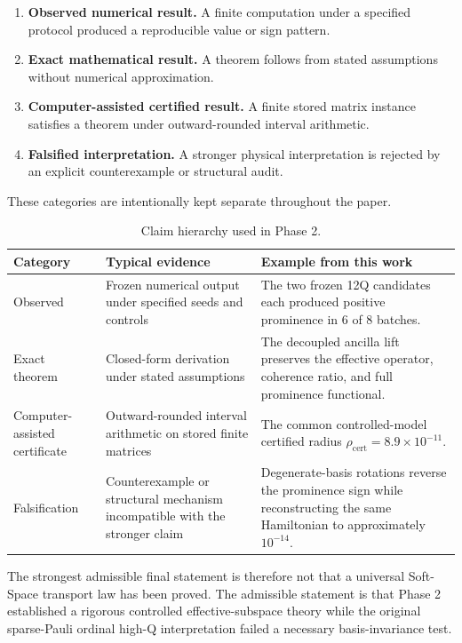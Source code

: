 \documentclass[11pt,a4paper]{article}
\begin{document}
\begin{enumerate}[label=\arabic*.]
\item \textbf{Observed numerical result.}
      A finite computation under a specified protocol produced a reproducible
      value or sign pattern.
\item \textbf{Exact mathematical result.}
      A theorem follows from stated assumptions without numerical
      approximation.
\item \textbf{Computer-assisted certified result.}
      A finite stored matrix instance satisfies a theorem under outward-rounded
      interval arithmetic.
\item \textbf{Falsified interpretation.}
      A stronger physical interpretation is rejected by an explicit
      counterexample or structural audit.
\end{enumerate}

These categories are intentionally kept separate throughout the paper.

\begin{table}[H]
\centering
\caption{Claim hierarchy used in Phase 2.}
\begin{tabular}{@{}p{}p{}p{}@{}}
\toprule
Category & Typical evidence & Example from this work\\
\midrule
Observed &
Frozen numerical output under specified seeds and controls &
The two frozen 12Q candidates each produced positive prominence in 6 of 8 batches.\\

Exact theorem &
Closed-form derivation under stated assumptions &
The decoupled ancilla lift preserves the effective operator, coherence ratio,
and full prominence functional.\\

Computer-assisted certificate &
Outward-rounded interval arithmetic on stored finite matrices &
The common controlled-model certified radius
\(\rho_{\mathrm{cert}}=8.9\times10^{-11}\).\\

Falsification &
Counterexample or structural mechanism incompatible with the stronger claim &
Degenerate-basis rotations reverse the prominence sign while reconstructing
the same Hamiltonian to approximately \(10^{-14}\).\\
\bottomrule
\end{tabular}
\end{table}

The strongest admissible final statement is therefore not that a universal
Soft-Space transport law has been proved.  The admissible statement is that
Phase 2 established a rigorous controlled effective-subspace theory while the
original sparse-Pauli ordinal high-Q interpretation failed a necessary
basis-invariance test.
\end{document}
